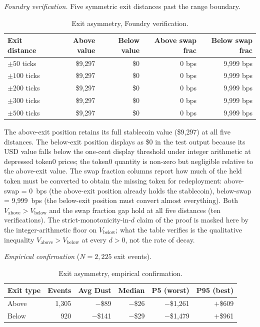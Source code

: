 \documentclass[11pt,a4paper]{article}
\theoremstyle{definition}
\begin{document}
\noindent\textit{Foundry verification.} Five symmetric exit distances past the range boundary.

\begin{table}[H]
\centering
\caption{Exit asymmetry, Foundry verification.}\label{tab:t6-foundry}
\begin{tabular}{@{}lrrrr@{}}
\toprule
Exit distance & Above value & Below value & Above swap frac & Below swap frac \\
\midrule
$\pm 50$ ticks & \$9,297 & \$0 & 0 bps & 9,999 bps \\
$\pm 100$ ticks & \$9,297 & \$0 & 0 bps & 9,999 bps \\
$\pm 200$ ticks & \$9,297 & \$0 & 0 bps & 9,999 bps \\
$\pm 300$ ticks & \$9,297 & \$0 & 0 bps & 9,999 bps \\
$\pm 500$ ticks & \$9,297 & \$0 & 0 bps & 9,999 bps \\
\bottomrule
\end{tabular}
\end{table}

\noindent The above-exit position retains its full stablecoin value (\$9{,}297) at all five distances. The below-exit position displays as \$0 in the test output because its USD value falls below the one-cent display threshold under integer arithmetic at depressed token0 prices; the token0 quantity is non-zero but negligible relative to the above-exit value. The swap fraction columns report how much of the held token must be converted to obtain the missing token for redeployment: above-swap = 0~bps (the above-exit position already holds the stablecoin), below-swap = 9{,}999~bps (the below-exit position must convert almost everything). Both $V_{\text{above}} > V_{\text{below}}$ and the swap fraction gap hold at all five distances (ten verifications). The strict-monotonicity-in-$d$ claim of the proof is masked here by the integer-arithmetic floor on $V_{\text{below}}$; what the table verifies is the qualitative inequality $V_{\text{above}} > V_{\text{below}}$ at every $d > 0$, not the rate of decay.

\medskip
\noindent\textit{Empirical confirmation} ($N = 2{,}225$ exit events).

\begin{table}[H]
\centering
\caption{Exit asymmetry, empirical confirmation.}\label{tab:t6-empirical}
\begin{tabular}{@{}lrrrrr@{}}
\toprule
Exit type & Events & Avg Dust & Median & P5 (worst) & P95 (best) \\
\midrule
Above & 1,305 & $-$\$89 & $-$\$26 & $-$\$1,261 & $+$\$609 \\
Below & 920 & $-$\$141 & $-$\$29 & $-$\$1,479 & $+$\$961 \\
\bottomrule
\end{tabular}
\end{table}
\end{document}
